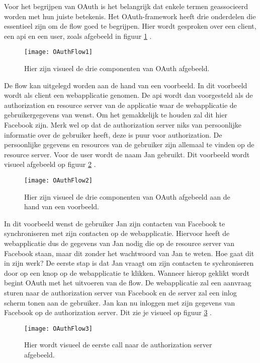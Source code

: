 Voor het begrijpen van OAuth is het belangrijk dat enkele termen geassocieerd worden met hun juiste betekenis. Het OAuth-framework heeft drie onderdelen die essentieel zijn om de flow goed te begrijpen. Hier wordt gesproken over een client, een api en een user, zoals afgebeeld in figuur \ref{fig:oauth1} \autocite{Services2016}.
\begin{figure}[H]
	\centering
	\texttt{[image: OAuthFlow1]} 
	\caption[Visueel de drie componenten]{Hier zijn visueel de drie componenten van OAuth afgebeeld.}
	\label{fig:oauth1}
\end{figure}
De flow kan uitgelegd worden aan de hand van een voorbeeld. In dit voorbeeld wordt als client een webapplicatie genomen. De api wordt dan voorgesteld als de authorization en resource server van de applicatie waar de webapplicatie de gebruikergegevens van wenst. Om het gemakkelijk te houden zal dit hier Facebook zijn. Merk wel op dat de authorization server niks van persoonlijke informatie over de gebruiker heeft, deze is puur voor authorization. De persoonlijke gegevens en resources van de gebruiker zijn allemaal te vinden op de resource server. Voor de user wordt de naam Jan gebruikt. Dit voorbeeld wordt visueel afgebeeld op figuur \ref{fig:oauth2} \autocite{Deniss2016} \autocite{Services2016}.
\begin{figure}[H]
	\centering
	\texttt{[image: OAuthFlow2]} 
	\caption[De drie componenten aan de hand van een voorbeeld]{Hier zijn visueel de drie componenten van OAuth afgebeeld aan de hand van een voorbeeld.}
	\label{fig:oauth2}
\end{figure}
In dit voorbeeld wenst de gebruiker Jan zijn contacten van Facebook te synchroniseren met zijn contacten op de webapplicatie. Hiervoor heeft de webapplicatie dus de gegevens van Jan nodig die op de resource server van Facebook staan, maar dit zonder het wachtwoord van Jan te weten. Hoe gaat dit in zijn werk?
De eerste stap is dat Jan vraagt om zijn contacten te sychroniseren door op een knop op de webapplicatie te klikken. Wanneer hierop geklikt wordt begint OAuth met het uitvoeren van de flow. De webapplicatie zal een aanvraag sturen naar de authorization server van Facebook en de server zal een inlog scherm tonen aan de gebruiker. Jan kan nu inloggen met zijn gegevens van Facebook op de authorization server. Dit zie je visueel op figuur \ref{fig:oauth3} \autocite{Services2016} \autocite{OktaDev2018}.
\begin{figure}[H]
	\centering
	\texttt{[image: OAuthFlow3]} 
	\caption[Eerste call naar de authorization server]{Hier wordt visueel de eerste call naar de authorization server afgebeeld.}
	\label{fig:oauth3}
\end{figure}
